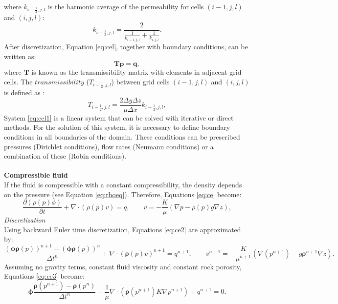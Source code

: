\documentclass[12pt]{article}
\begin{document}
where $k_{i-\frac{1}{2},j,l}$ is the harmonic average of the permeability for cells 
$(i-1,j,l)$ and $(i,j,l)$:
\begin{equation}\label{eq:ha}
 k_{i-\frac{1}{2},j,l}=\frac{2}{\frac{1}{ k_{i-1,j,l}}+\frac{1}{ k_{i,j,l}}}.
\end{equation}
After discretization, Equation \eqref{eq:cel}, together with boundary conditions, can be written as:
 \begin{equation}\label{eq:cel1}
\mathbf{T}\mathbf{p} = \mathbf{q},
\end{equation}
where $\mathbf{T}$ is known as the transmissibility matrix with elements in adjacent grid cells. The $transmissibility$ ($T_{i-\frac{1}{2},j,l}$) between grid cells $(i-1,j,l)$ and $(i,j,l)$ is defined as \cite{Cordazzo02}:
\begin{equation}\label{eq:htrans}
 T_{i-\frac{1}{2},j,l}=\frac{2\Delta y \Delta z}{\mu\Delta x}k_{i-\frac{1}{2},j,l},
\end{equation} 
System \eqref{eq:cel1} is a linear system that can be solved with iterative or direct methods. For the solution of this system, it is necessary to define boundary conditions in all boundaries of the domain. These conditions can be prescribed pressures 
(Dirichlet conditions), flow rates (Neumann conditions) or a combination of these (Robin conditions).  \\\\
\textbf{Compressible fluid}\\
If the fluid is compressible with a constant compressibility, the density depends on the pressure (see Equation \eqref{eq:rhoeq}). Therefore, Equations \eqref{eq:ce} become:
\begin{equation}\label{eq:ce2}
\frac{\partial (\rho(p) \phi)}{\partial t}+ \nabla \cdot ( \rho(p) {v})=q, \qquad v=-\frac{K}{\mu}(\nabla p-\rho(p) g\nabla z),
\end{equation}
\emph{Discretization}\\
Using backward Euler time discretization, Equations \eqref{eq:ce2} are approximated by:
\begin{equation}\label{eq:ce3}
 \frac{(\mathbf{\phi}\mathbf{\rho}(p))^{n+1}-(\mathbf{\phi}\mathbf{\rho}(p))^{n}}{\Delta t^n}
 +\nabla \cdot (\mathbf{\rho}({p}) v)^{n+1}={q}^{n+1},
\qquad
{v}^{n+1}= -\frac{{K}}{\mu^{n+1}}(\nabla({p}^{n+1})-g\mathbf{\rho}^{n+1}\nabla{z}).
\end{equation}
Assuming no gravity terms, constant fluid viscosity and constant rock porosity, Equations \eqref{eq:ce3}
become:
\begin{equation}\label{eq:ce4}
 \mathbf{\phi}\frac{\mathbf{\rho}({p}^{n+1})
 -\mathbf{\rho}({p}^{n})}{\Delta t^n}
 -\frac{1}{\mu}\nabla \cdot (\mathbf{\rho}({p}^{n+1}) 
 {K}\nabla{p}^{n+1})+{q}^{n+1}=0.
\end{equation}
\end{document}
